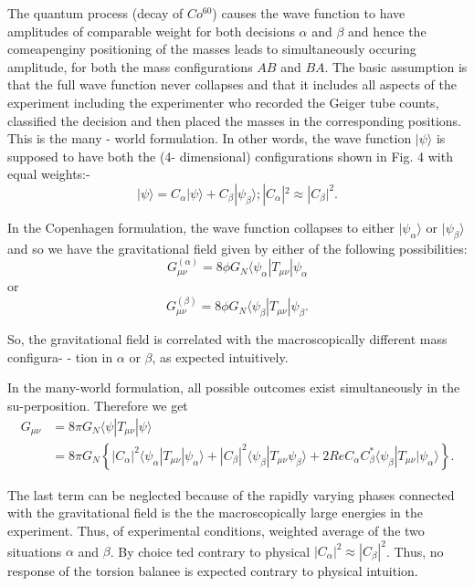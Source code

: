 The quantum process (decay of $Co^{60}$) causes the wave function to have amplitudes of
comparable weight for both decisions $\alpha$ and $\beta$ and hence the comeapenginy positioning of
the masses leads to simultaneously occuring amplitude, for both the mass configurations
$AB$
and $BA$.
The basic assumption is that the full wave function never collapses and
that it includes all aspects of the experiment including the experimenter who recorded the
Geiger tube counts, classified the decision and then placed the masses in the corresponding
positions.
This is the many - world formulation.
In other words, the wave function $|\psi \rangle$
is supposed to have both the (4- dimensional) configurations shown in Fig. 4 with equal
weights:-
$$
| \psi \rangle = C_{\alpha} | \psi \rangle + C_{\beta} | \psi_{\beta} \rangle ; |C_{\alpha}|^{2} \approx |C_{\beta}|^{2}. 
$$

In the Copenhagen formulation, the wave function collapses to either $|\psi_{\alpha}\rangle$ or $|\psi_{\beta}\rangle$ and 
so we have the gravitational field given by either of the following possibilities:
$$
G_{\mu \nu}^{(\alpha)} = 8\phi G_{N}\langle \psi_{\alpha} | T_{\mu \nu} | \psi_{\alpha}
$$
 or
 $$
 G_{\mu \nu}^{(\beta)} = 8\phi G_{N}\langle \psi_{\beta} | T_{\mu \nu} | \psi_{\beta}.
 $$
 
 So, the gravitational field is correlated with the macroscopically different mass configura-
- tion in $\alpha$ or $\beta$, as expected intuitively.


In the many-world formulation, all possible outcomes exist simultaneously in the su-perposition. Therefore we get
\begin{align*}
G_{\mu \nu} &= 8\pi G_{N} \langle \psi | T_{\mu \nu} | \psi\rangle\\
            &= 8 \pi G_{N} \left\{|C_{\alpha}|^{2} \langle \psi_{\alpha} | T_{\mu \nu} | \psi_{\alpha}\rangle + |C_{\beta}|^{2} \langle \psi_{\beta} | T_{\mu \nu} \psi_{\beta} \rangle + 2 Re C_{\alpha} C_{\beta}^{*} \langle \psi_{\beta}| T_{\mu \nu} | \psi_{\alpha} \rangle\right\}. 
\end{align*}

The last term can be neglected because of the rapidly varying phases connected with
the gravitational field is the
the macroscopically large energies in the experiment. Thus,
of experimental conditions,
weighted average of the two situations $\alpha$ and $\beta$. By choice
ted contrary to physical
$|C_{\alpha}|^{2} \approx |C_{\beta}|^{2}$. Thus, no response of the torsion balanee is expected contrary to physical intuition.

